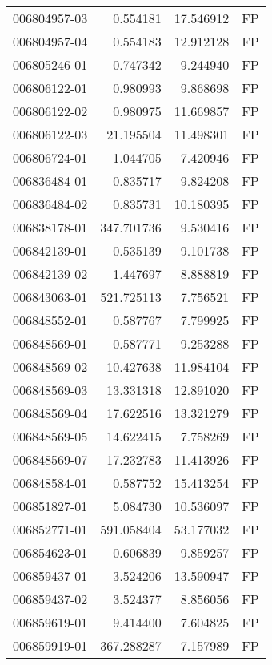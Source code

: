 \begin{tabular}{lrrl}
006804957-03 &    0.554181 &      17.546912 &   FP \\
006804957-04 &    0.554183 &      12.912128 &   FP \\
006805246-01 &    0.747342 &       9.244940 &   FP \\
006806122-01 &    0.980993 &       9.868698 &   FP \\
006806122-02 &    0.980975 &      11.669857 &   FP \\
006806122-03 &   21.195504 &      11.498301 &   FP \\
006806724-01 &    1.044705 &       7.420946 &   FP \\
006836484-01 &    0.835717 &       9.824208 &   FP \\
006836484-02 &    0.835731 &      10.180395 &   FP \\
006838178-01 &  347.701736 &       9.530416 &   FP \\
006842139-01 &    0.535139 &       9.101738 &   FP \\
006842139-02 &    1.447697 &       8.888819 &   FP \\
006843063-01 &  521.725113 &       7.756521 &   FP \\
006848552-01 &    0.587767 &       7.799925 &   FP \\
006848569-01 &    0.587771 &       9.253288 &   FP \\
006848569-02 &   10.427638 &      11.984104 &   FP \\
006848569-03 &   13.331318 &      12.891020 &   FP \\
006848569-04 &   17.622516 &      13.321279 &   FP \\
006848569-05 &   14.622415 &       7.758269 &   FP \\
006848569-07 &   17.232783 &      11.413926 &   FP \\
006848584-01 &    0.587752 &      15.413254 &   FP \\
006851827-01 &    5.084730 &      10.536097 &   FP \\
006852771-01 &  591.058404 &      53.177032 &   FP \\
006854623-01 &    0.606839 &       9.859257 &   FP \\
006859437-01 &    3.524206 &      13.590947 &   FP \\
006859437-02 &    3.524377 &       8.856056 &   FP \\
006859619-01 &    9.414400 &       7.604825 &   FP \\
006859919-01 &  367.288287 &       7.157989 &   FP \\

\end{tabular}
